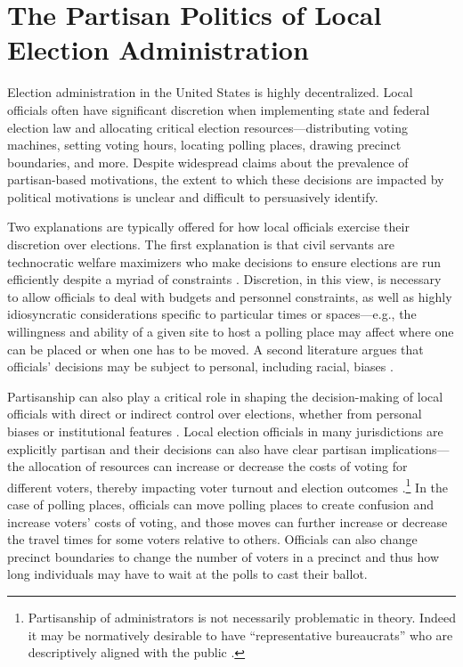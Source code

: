 \documentclass[12pt]{article}
\begin{document}


\section{\large The Partisan Politics of Local Election Administration}\label{section_lit}
\vspace*{-0.5cm}

Election administration in the United States is highly decentralized.  Local officials often have significant discretion when implementing state and federal election law and allocating critical election resources---distributing voting machines, setting voting hours, locating polling places, drawing precinct boundaries, and more.  Despite widespread claims about the prevalence of partisan-based motivations, the extent to which these decisions are impacted by political motivations is unclear and difficult to persuasively identify.

Two explanations are typically offered for how local officials exercise their discretion over elections.  The first explanation is that civil servants are technocratic welfare maximizers who make decisions to ensure elections are run efficiently despite a myriad of constraints \citep{mladenka}. Discretion, in this view, is necessary to allow officials to deal with budgets and personnel constraints, as well as highly idiosyncratic considerations specific to particular times or spaces---e.g., the willingness and ability of a given site to host a polling place may affect where one can be placed or when one has to be moved. A second literature argues that officials' decisions may be subject to personal, including racial, biases \citep{atkeson,cobbgriner,white2015need}.

Partisanship can also play a critical role in shaping the decision-making of local officials with direct or indirect control over elections, whether from personal biases or institutional features \citep{kropf,kropfPAR,burnettprentice,mohretal2019, kimball2006helping}.  Local election officials in many jurisdictions are explicitly partisan and their decisions can also have clear partisan implications---the allocation of resources can increase or decrease the costs of voting for different voters, thereby impacting voter turnout and election outcomes \citep{jamesstatecraft,porter2018partisanship}.\footnote{Partisanship of administrators is not necessarily problematic in theory.  Indeed it may be normatively desirable to have ``representative bureaucrats'' who are descriptively aligned with the public \citep{kropfPAR}.    } In the case of polling places, officials can move polling places to create confusion and increase voters' costs of voting, and those moves can further increase or decrease the travel times for some voters relative to others.  Officials can also change precinct boundaries to change the number of voters in a precinct and thus how long individuals may have to wait at the polls to cast their ballot.
\end{document}
